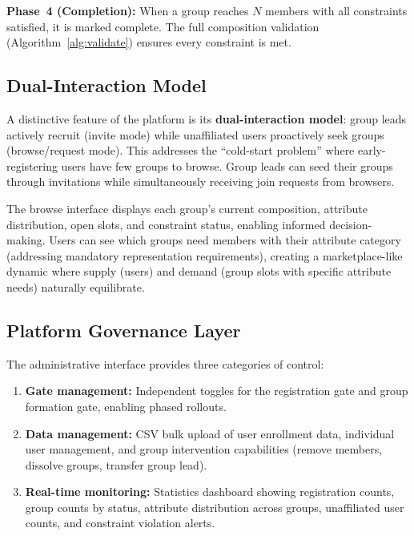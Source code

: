 \documentclass[11pt,a4paper]{article}
\theoremstyle{plain}
\theoremstyle{definition}
\theoremstyle{remark}
\begin{document}
\textbf{Phase~4 (Completion):} When a group reaches $N$ members with all constraints satisfied, it is marked complete. The full composition validation (Algorithm~\ref{alg:validate}) ensures every constraint is met.

\subsection{Dual-Interaction Model}

A distinctive feature of the platform is its \textbf{dual-interaction model}: group leads actively recruit (invite mode) while unaffiliated users proactively seek groups (browse/request mode). This addresses the ``cold-start problem'' where early-registering users have few groups to browse. Group leads can seed their groups through invitations while simultaneously receiving join requests from browsers.

The browse interface displays each group's current composition, attribute distribution, open slots, and constraint status, enabling informed decision-making. Users can see which groups need members with their attribute category (addressing mandatory representation requirements), creating a marketplace-like dynamic where supply (users) and demand (group slots with specific attribute needs) naturally equilibrate.

\subsection{Platform Governance Layer}

The administrative interface provides three categories of control:
\begin{enumerate}[noitemsep,topsep=4pt]
    \item \textbf{Gate management:} Independent toggles for the registration gate and group formation gate, enabling phased rollouts.
    \item \textbf{Data management:} CSV bulk upload of user enrollment data, individual user management, and group intervention capabilities (remove members, dissolve groups, transfer group lead).
    \item \textbf{Real-time monitoring:} Statistics dashboard showing registration counts, group counts by status, attribute distribution across groups, unaffiliated user counts, and constraint violation alerts.
\end{enumerate}

\end{document}
